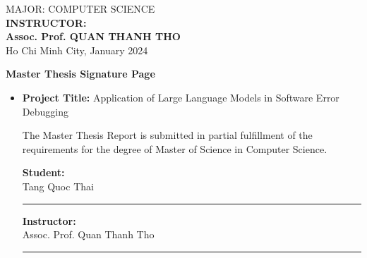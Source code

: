 \documentclass[a4paper,oneside]{book}
\begin{document}
\begin{titlepage}
    \begin{center}
        {\fontsize{14.4pt}{1} MAJOR: COMPUTER SCIENCE}\\[.2cm]
        {\fontsize{14.4pt}{1}
        \textbf{INSTRUCTOR:}\\[.2cm]
        \textbf{Assoc. Prof. QUAN THANH THO}\\[.2cm]
        {\fontsize{14.4pt}{1} Ho Chi Minh City, January 2024}}
    \end{center}
\end{titlepage}

\newpage
\begin{titlepage}
    \thispagestyle{empty}
    \begin{center}
        \begin{large}
            \textbf{Master Thesis Signature Page}
        \end{large}
    \end{center}
    \vspace{1.2cm}
    \begin{itemize}
        \item[] \textbf{Project Title:} Application of Large Language Models in Software Error Debugging
            \vspace{1cm}

            The Master Thesis Report is submitted in partial fulfillment of the requirements for the degree of Master of Science in Computer Science.
            \vspace{2cm}

            \begin{minipage}{0.5\textwidth}
                \textbf{Student:} \\[2cm]
                Tang Quoc Thai\\[0.25cm]
                \hrulefill
                \rule{7cm}{0.4pt}
            \end{minipage}
            \begin{minipage}{0.5\textwidth}
                \begin{flushright}
                    \textbf{Instructor:} \\[2cm]
                    Assoc. Prof. Quan Thanh Tho\\[0.25cm]
                    \hrulefill
                    \rule{7cm}{0.4pt}
                \end{flushright}
            \end{minipage}
            \vspace{1cm}
    \end{itemize}
\end{titlepage}
\end{document}
